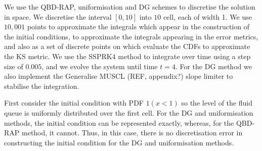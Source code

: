 We use the QBD-RAP, uniformisation and DG schemes to discretise the solution in space. We discretise the interval \([0,10]\) into \(10\) cell, each of width 1. We use \(10,001\) points to approximate the integrals which appear in the construction of the initial conditions, to approximate the integrals appearing in the error metrics, and also as a set of discrete points on which evaluate the CDFs to approximate the KS metric. We use the SSPRK4 method to integrate over time using a step size of \(0.005\), and we evolve the system until time \(t=4\). For the DG method we also implement the Generalise MUSCL (REF, appendix?) slope limiter to stabilise the integration. 

First consider the initial condition with PDF \(1(x<1)\) so the level of the fluid queue is uniformly distributed over the first cell. For the DG and uniformisation methods, the initial condition can be represented exactly, whereas, for the QBD-RAP method, it cannot. Thus, in this case, there is no discretisation error in constructing the initial condition for the DG and uniformisation methods. 




































